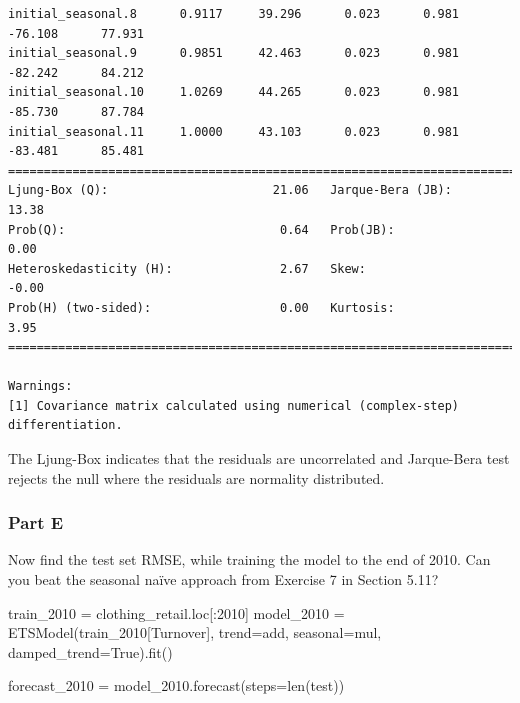 \documentclass[
  11pt,
]{article}
\newenvironment{Shaded}{\begin{snugshade}}{\end{snugshade}}
\newcommand{\BuiltInTok}[1]{\textcolor[rgb]{0.00,0.23,0.31}{#1}}
\newcommand{\NormalTok}[1]{\textcolor[rgb]{0.00,0.23,0.31}{#1}}
\newcommand{\OperatorTok}[1]{\textcolor[rgb]{0.37,0.37,0.37}{#1}}
\newcommand{\StringTok}[1]{\textcolor[rgb]{0.13,0.47,0.30}{#1}}
\newcommand{\VariableTok}[1]{\textcolor[rgb]{0.07,0.07,0.07}{#1}}
\begin{document}
\begin{verbatim}
initial_seasonal.8      0.9117     39.296      0.023      0.981     -76.108      77.931
initial_seasonal.9      0.9851     42.463      0.023      0.981     -82.242      84.212
initial_seasonal.10     1.0269     44.265      0.023      0.981     -85.730      87.784
initial_seasonal.11     1.0000     43.103      0.023      0.981     -83.481      85.481
===================================================================================
Ljung-Box (Q):                       21.06   Jarque-Bera (JB):                13.38
Prob(Q):                              0.64   Prob(JB):                         0.00
Heteroskedasticity (H):               2.67   Skew:                            -0.00
Prob(H) (two-sided):                  0.00   Kurtosis:                         3.95
===================================================================================

Warnings:
[1] Covariance matrix calculated using numerical (complex-step) differentiation.
\end{verbatim}

The Ljung-Box indicates that the residuals are uncorrelated and
Jarque-Bera test rejects the null where the residuals are normality
distributed.

\subsubsection{Part E}\label{part-e-1}

Now find the test set RMSE, while training the model to the end of 2010.
Can you beat the seasonal naïve approach from Exercise 7 in Section
5.11?

\begin{Shaded}
\begin{Highlighting}[]
\NormalTok{train\_2010 }\OperatorTok{=}\NormalTok{ clothing\_retail.loc[:}\StringTok{\textquotesingle{}2010\textquotesingle{}}\NormalTok{]  }
\NormalTok{model\_2010 }\OperatorTok{=}\NormalTok{ ETSModel(train\_2010[}\StringTok{\textquotesingle{}Turnover\textquotesingle{}}\NormalTok{], trend}\OperatorTok{=}\StringTok{\textquotesingle{}add\textquotesingle{}}\NormalTok{, seasonal}\OperatorTok{=}\StringTok{\textquotesingle{}mul\textquotesingle{}}\NormalTok{, damped\_trend}\OperatorTok{=}\VariableTok{True}\NormalTok{).fit() }

\NormalTok{forecast\_2010 }\OperatorTok{=}\NormalTok{ model\_2010.forecast(steps}\OperatorTok{=}\BuiltInTok{len}\NormalTok{(test)) }
\end{Highlighting}
\end{Shaded}
\end{document}
